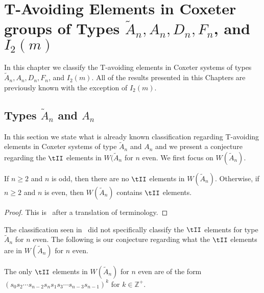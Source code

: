 \section{T-Avoiding Elements in Coxeter groups of Types $\widetilde{A}_n, A_n, D_n, F_n$, and $I_2(m)$}\label{chap:TandTavoid}

In this chapter we classify the T-avoiding elements in Coxeter systems of types $\widetilde{A}_n, A_n, D_n, F_n$, and $I_2(m)$. All of the results presented in this Chapters are previously known with the exception of $I_2(m)$.


\subsection{Types $\widetilde{A}_n$ and $A_n$}\label{sec:tavoidA}
In this section we state what is already known classification regarding T-avoiding elements in Coxeter systems of type $\widetilde{A}_n$ and $A_n$ and we present a conjecture regarding the $\tII$ elements in $W(\widetilde{A}_n$ for $n$ even. We first focus on $W(\widetilde{A}_n)$.

\begin{proposition}
 If $n \geq 2$ and $n$ is odd, then there are no $\tII$ elements in $W(\widetilde{A}_n)$. Otherwise, if $n \geq 2$ and $n$ is even, then $W(\widetilde{A}_n)$ contains $\tII$ elements.
\begin{proof}
	This is~\cite[Proposition~3.1.2]{Fan1999} after a translation of terminology.\qedhere
\end{proof}
\end{proposition}



The classification seen in~\cite{Fan1999} did not specifically classify the $\tII$ elements for type $\widetilde{A}_n$ for $n$ even. The following is our conjecture regarding what the $\tII$ elements are in $W(\widetilde{A}_n)$ for $n$ even.
\begin{conjecture}
	The only $\tII$ elements in $W(\widetilde{A}_n)$ for $n$ even are of the form $(s_0s_2 \cdots s_{n-2}s_ns_1s_3 \cdots s_{n-3}s_{n-1})^k$  for $k \in \mathbb{Z}^+$. 
\end{conjecture} 

